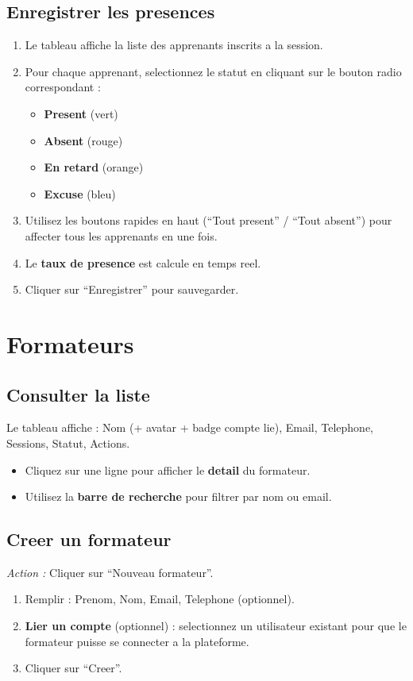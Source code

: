 \documentclass[a4paper,11pt]{article}
\newcommand{\etape}[1]{\textcolor{step}{\textbf{\'Etape :} #1}}
\newcommand{\action}[1]{\textcolor{brand}{\textit{Action :} #1}}
\begin{document}
\subsection{Enregistrer les presences}
\begin{enumerate}[label=\etape{\arabic*}]
  \item Le tableau affiche la liste des apprenants inscrits a la session.
  \item Pour chaque apprenant, selectionnez le statut en cliquant sur le bouton radio correspondant :
    \begin{itemize}
      \item \textcolor{green}{\textbullet} \textbf{Present} (vert)
      \item \textcolor{red}{\textbullet} \textbf{Absent} (rouge)
      \item \textcolor{orange}{\textbullet} \textbf{En retard} (orange)
      \item \textcolor{blue}{\textbullet} \textbf{Excuse} (bleu)
    \end{itemize}
  \item Utilisez les boutons rapides en haut (``Tout present'' / ``Tout absent'') pour affecter tous les apprenants en une fois.
  \item Le \textbf{taux de presence} est calcule en temps reel.
  \item Cliquer sur ``Enregistrer'' pour sauvegarder.
\end{enumerate}


\section{Formateurs}

\subsection{Consulter la liste}
Le tableau affiche : Nom (+ avatar + badge compte lie), Email, Telephone, Sessions, Statut, Actions.
\begin{itemize}
  \item Cliquez sur une ligne pour afficher le \textbf{detail} du formateur.
  \item Utilisez la \textbf{barre de recherche} pour filtrer par nom ou email.
\end{itemize}

\subsection{Creer un formateur}
\action{Cliquer sur ``Nouveau formateur''.}
\begin{enumerate}[label=\etape{\arabic*}]
  \item Remplir : Prenom, Nom, Email, Telephone (optionnel).
  \item \textbf{Lier un compte} (optionnel) : selectionnez un utilisateur existant pour que le formateur puisse se connecter a la plateforme.
  \item Cliquer sur ``Creer''.
\end{enumerate}
\end{document}
